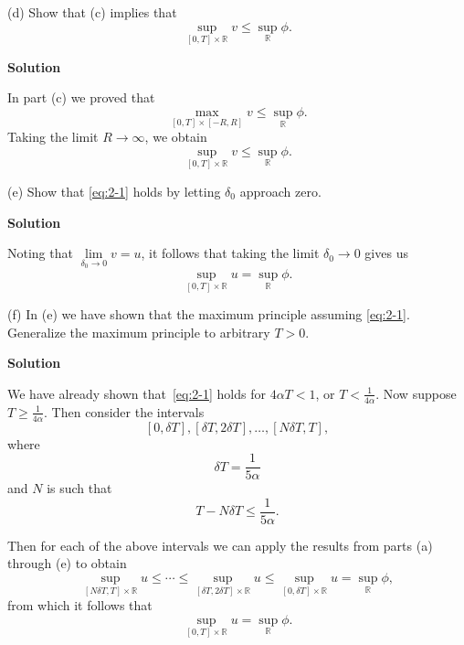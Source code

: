 \documentclass{article}
\begin{document}
\vspace{5mm}

(d) Show that (c) implies that
%
\begin{equation*}
    \sup_{[0, T] \times \mathbb{R}} v \leq \sup_\mathbb{R} \phi
    .
\end{equation*}

\textbf{Solution}

In part (c) we proved that
%
\begin{equation*}
    \max_{[0, T] \times [-R, R]} v \leq \sup_\mathbb{R} \phi
    .
\end{equation*}
%
Taking the limit $R \to \infty$, we obtain
%
\begin{equation*}
    \sup_{[0, T] \times \mathbb{R}} v \leq \sup_\mathbb{R} \phi
    .
\end{equation*}

\vspace{5mm}

(e) Show that \eqref{eq:2-1} holds by letting $\delta_0$ approach zero.

\textbf{Solution}

Noting that $\lim\limits_{\delta_0 \to 0} v = u$, it follows that taking
the limit $\delta_0 \to 0$ gives us
%
\begin{equation*}
    \sup_{[0, T] \times \mathbb{R}} u = \sup_{\mathbb{R}} \phi
    .
\end{equation*}

\vspace{5mm}

(f) In (e) we have shown that the maximum principle assuming
\eqref{eq:2-1}. Generalize the maximum principle to arbitrary $T > 0$.

\textbf{Solution}

We have already shown that~\eqref{eq:2-1} holds for $4 \alpha T < 1$, or
$T < \frac{1}{4 \alpha}$. Now suppose $T \geq \frac{1}{4 \alpha}$. Then
consider the intervals \[[0, \delta T], [\delta T, 2 \delta T], \ldots,
[N \delta T, T],\] where \[\delta T = \frac{1}{5 \alpha}\] and $N$
is such that \[T - N \delta T \leq \frac{1}{5 \alpha}.\]

Then for each of the above intervals we can apply the results from parts
(a) through (e) to obtain
%
\begin{equation*}
    \sup_{[N \delta T, T] \times \mathbb{R}} u
    \leq \cdots
    \leq \sup_{[\delta T, 2 \delta T] \times \mathbb{R}} u
    \leq \sup_{[0, \delta T] \times \mathbb{R}} u
    = \sup_\mathbb{R} \phi
    ,
\end{equation*}
%
from which it follows that
%
\begin{equation*}
    \sup_{[0, T] \times \mathbb{R}} u = \sup_{\mathbb{R}} \phi
    .
\end{equation*}
\end{document}
